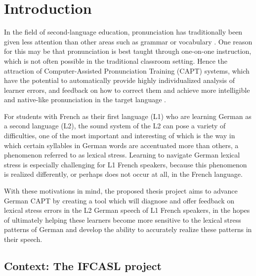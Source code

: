 %
%
\chapter{Introduction}
\label{chap:intro}


In the field of second-language education, pronunciation has traditionally been given less attention than other areas such as grammar or vocabulary \citep{Derwing2005}. One reason for this may be that pronunciation is best taught through one-on-one instruction, which is not often possible in the traditional classroom setting. Hence the attraction of Computer-Assisted Pronunciation Training (CAPT) systems, which have the potential to automatically provide highly individualized analysis of learner errors, and feedback on how to correct them and achieve more intelligible and native-like pronunciation in the target language \citep{Witt2012}. 


For students with French as their first language (L1) who are learning German as a second language (L2), the sound system of the L2 can pose a variety of difficulties, one of the most important and interesting of which is the way in which certain syllables in German words are accentuated more than others, a phenomenon referred to as lexical stress. Learning to navigate German lexical stress is especially challenging for L1 French speakers, because this phenomenon is realized differently, or perhaps does not occur at all, in the French language. 

With these motivations in mind, the proposed thesis project aims to advance 
German CAPT %
by creating a tool which will diagnose and offer feedback on lexical stress errors in the L2 German speech of L1 French speakers, in the hopes of ultimately
helping these learners become more sensitive to the lexical stress patterns of German and develop the ability to accurately realize these patterns in their speech. 

\section{Context: The IFCASL project}
\label{sec:intro:ifcasl}

